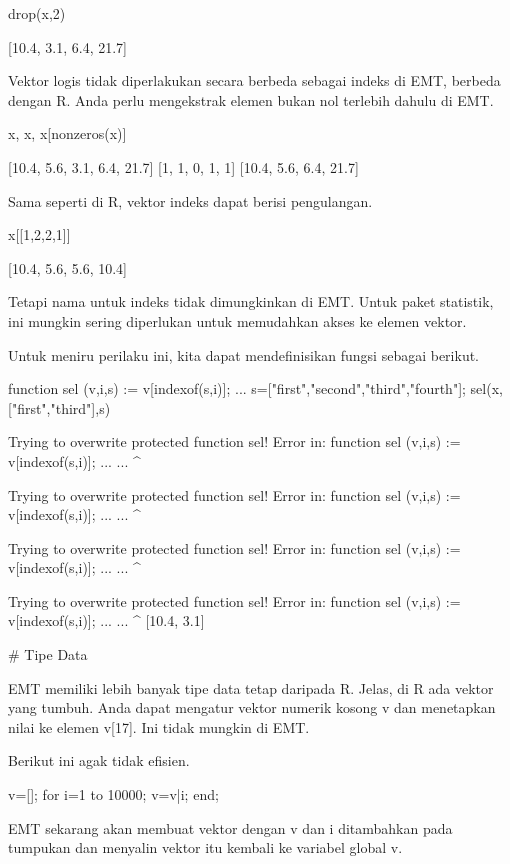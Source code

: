 \documentclass{article}
\begin{document}
\>drop(x,2)


    [10.4,  3.1,  6.4,  21.7]

Vektor logis tidak diperlakukan secara berbeda sebagai indeks di EMT,
berbeda dengan R. Anda perlu mengekstrak elemen bukan nol terlebih
dahulu di EMT.


\>x, x, x[nonzeros(x)]


    [10.4,  5.6,  3.1,  6.4,  21.7]
    [1,  1,  0,  1,  1]
    [10.4,  5.6,  6.4,  21.7]

Sama seperti di R, vektor indeks dapat berisi pengulangan.


\>x[[1,2,2,1]]


    [10.4,  5.6,  5.6,  10.4]

Tetapi nama untuk indeks tidak dimungkinkan di EMT. Untuk paket
statistik, ini mungkin sering diperlukan untuk memudahkan akses ke
elemen vektor.


Untuk meniru perilaku ini, kita dapat mendefinisikan fungsi sebagai
berikut.


\>function sel (v,i,s) := v[indexof(s,i)]; ...  
\>   s=["first","second","third","fourth"]; sel(x,["first","third"],s)


    
    Trying to overwrite protected function sel!
    Error in:
    function sel (v,i,s) := v[indexof(s,i)]; ... ...
                 ^
    
    Trying to overwrite protected function sel!
    Error in:
    function sel (v,i,s) := v[indexof(s,i)]; ... ...
                 ^
    
    Trying to overwrite protected function sel!
    Error in:
    function sel (v,i,s) := v[indexof(s,i)]; ... ...
                 ^
    
    Trying to overwrite protected function sel!
    Error in:
    function sel (v,i,s) := v[indexof(s,i)]; ... ...
                 ^
    [10.4,  3.1]

# Tipe Data

EMT memiliki lebih banyak tipe data tetap daripada R. Jelas, di R ada
vektor yang tumbuh. Anda dapat mengatur vektor numerik kosong v dan
menetapkan nilai ke elemen v[17]. Ini tidak mungkin di EMT.


Berikut ini agak tidak efisien.


\>v=[]; for i=1 to 10000; v=v|i; end;


EMT sekarang akan membuat vektor dengan v dan i ditambahkan pada
tumpukan dan menyalin vektor itu kembali ke variabel global v.
\end{document}
